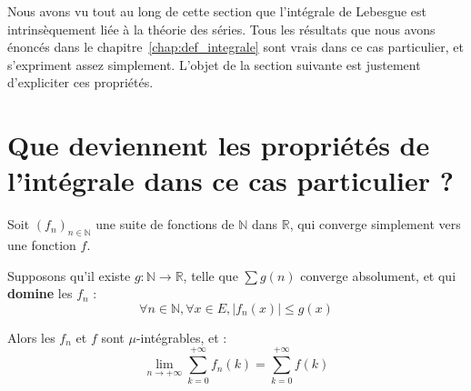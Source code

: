 \documentclass[../integ-proba.tex]{subfiles}
\begin{document}
    Nous avons vu tout au long de cette section que l'intégrale de Lebesgue est intrinsèquement liée à la théorie des séries.
    Tous les résultats que nous avons énoncés dans le chapitre~\ref{chap:def_integrale} sont vrais dans ce cas particulier, et s'expriment assez simplement.
    L'objet de la section suivante est justement d'expliciter ces propriétés.

    \section{Que deviennent les propriétés de l'intégrale dans ce cas particulier ?}

    \begin{thm}
      Soit $\left(f_n\right)_{n \in \mathbb{N}}$ une suite de fonctions de $\mathbb{N}$ dans $\mathbb{R}$, qui converge simplement vers une fonction $f$.

      Supposons qu'il existe $g:\mathbb{N} \longrightarrow \mathbb{R}$, telle que $\sum g(n)$ converge absolument, et qui \textbf{domine} les $f_n$ :
      \begin{displaymath}
          \forall n \in \mathbb{N}, \forall x \in E, \left|f_n(x)\right| \leq g(x)
      \end{displaymath}

      Alors les $f_n$ et $f$ sont $\mu$-intégrables, et :
      \begin{displaymath}
          \lim_{n \to + \infty} \sum_{k=0}^{+\infty} f_n(k) = \sum_{k=0}^{+\infty} f(k)
      \end{displaymath}
    \end{thm}
\end{document}
